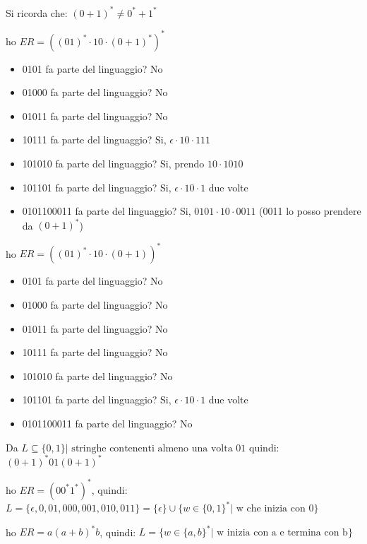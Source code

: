 Si ricorda che:
$(0+1)^*\neq 0^*+1^*$

\begin{example}
	ho $ER=((01)^*\cdot 10\cdot (0+1)^*)^*$
	\begin{itemize}
		\item 0101 fa parte del linguaggio? No
		\item 01000 fa parte del linguaggio? No
		\item 01011 fa parte del linguaggio? No
		\item 10111 fa parte del linguaggio? Si, $\epsilon\cdot 10\cdot 111$
		\item 101010 fa parte del linguaggio? Si, prendo $10\cdot 1010$
		\item 101101 fa parte del linguaggio? Si, $\epsilon\cdot 10\cdot 1$ due volte
		\item 0101100011 fa parte del linguaggio? Si, $0101\cdot 10\cdot 0011$ (0011 lo posso prendere da $(0+1)^*$)
	\end{itemize}
\end{example}
\begin{example}
ho $ER=((01)^*\cdot 10\cdot (0+1))^*$
\begin{itemize}
		\item 0101 fa parte del linguaggio? No
		\item 01000 fa parte del linguaggio? No
		\item 01011 fa parte del linguaggio? No
		\item 10111 fa parte del linguaggio? No
		\item 101010 fa parte del linguaggio? No
		\item 101101 fa parte del linguaggio? Si, $\epsilon\cdot 10\cdot 1$ due volte
		\item 0101100011 fa parte del linguaggio? No
	\end{itemize}
\end{example}
\begin{example}
	Da $L\subseteq\{0,1\}|\mbox{ stringhe contenenti almeno una volta 01}$
	quindi:
	$(0+1)^*01(0+1)^*$
\end{example}
\begin{example}
	ho $ER=(00^*1^*)^*$, quindi:
	$L=\{\epsilon,0,01,000,001,010,011\}=\{\epsilon\}\cup\{ w\in \{0,1\}^* |\text{ w che inizia con 0}\}$
\end{example}

\begin{example}
	ho $ER=a(a+b)^*b$, quindi:
	$L=\{w\in\{a,b\}^*|\text{ w inizia con a e termina con b}\}$
\end{example}

